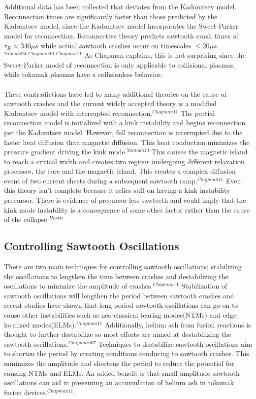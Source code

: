 \documentclass{article}
\begin{document}
\\\\Additional data has been collected that deviates from the Kadomtsev model.  Reconnection times are significantly faster than those predicted by the Kadomtsev model, since the Kadomtsev model incorporates the Sweet-Parker model for reconnection.  Reconnective theory predicts sawtooth crash times of $\tau_K \approx340 \mu s$ while actual sawtooth crashes occur on timescales $\leq20\mu s$.$^{Yamada94,Chapman10,Chapman11}$  As Chapman explains, this is not surprising since the Sweet-Parker model of reconnection is only applicable to collisional plasmas, while tokamak plasmas have a collisionless behavior.\\\\
These contradictions have led to many additional theories on the cause of sawtooth crashes and the current widely accepted theory is a modified Kadomtsev model with interrupted reconnection.$^{Chapman11}$  The partial reconnection model is initialized with a kink instability and begins reconnection per the Kadomtsev model.  However, full reconnection is interrupted due to the faster heat diffusion than magnetic diffusion.  This heat conduction minimizes the pressure gradient driving the kink mode.$^{Yamada10}$  This causes the magnetic island to reach a critical width and creates two regions undergoing different relaxation processes, the core and the magnetic island.  This creates a complex diffusion event of two current sheets during a subsequent sawtooth ramp.$^{Chapman11}$  Even this theory isn't complete because it relies still on having a kink instability precursor.  There is evidence of precursor-less sawteeth and could imply that the kink mode instability is a consequence of some other factor rather than the cause of the collapse.$^{Hastie}$
\subsection{Controlling Sawtooth Oscillations}
There are two main techniques for controlling sawtooth oscillations; stabilizing the oscillations to lengthen the time between crashes and destabilizing the oscillations to minimize the amplitude of crashes.$^{Chapman11}$  Stabilization of sawtooth oscillations will lengthen the period between sawtooth crashes and recent studies have shown that long period sawtooth oscillations can go on to cause other instabilities such as neo-classical tearing modes(NTMs) and edge localized modes(ELMs).$^{Chapman11}$  Additionally, helium ash from fusion reactions is thought to further destabilize so most efforts are aimed at destabilizing the sawtooth oscillations.$^{Chapmain07}$  Techniques to destabilize sawtooth oscillations aim to shorten the period by creating conditions conducing to sawtooth crashes.  This minimizes the amplitude and shortens the period to reduce the potential for causing NTMs and ELMs.  An added benefit is that small amplitude sawtooth oscillations can aid in preventing an accumulation of helium ash in tokomak fusion devices.$^{Chapman11}$
\newpage
\end{document}
